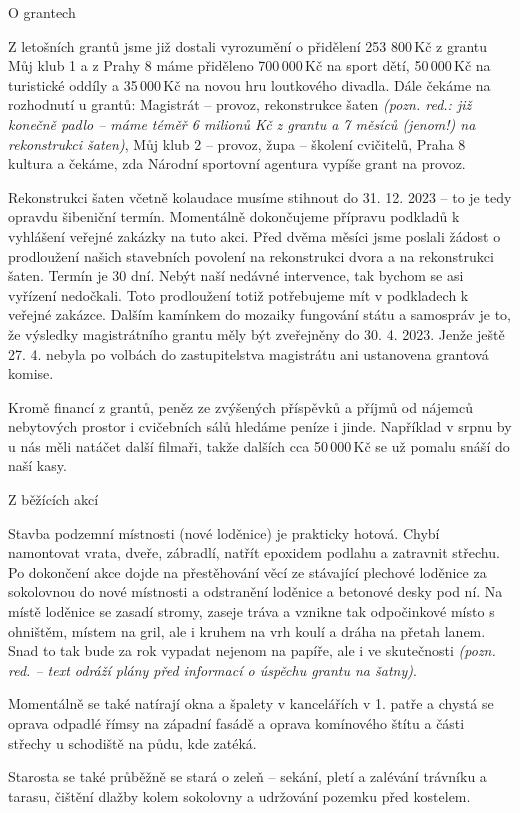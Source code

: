 \documentclass[11pt]{article}
\newcommand{\subpost}[1]{%
\vspace*{12pt}
\begin{center}
{\Large \tyrs #1}
\end{center}}
\begin{document}
\subpost{O grantech}
Z letošních grantů jsme již dostali vyrozumění o přidělení 253 800\,Kč z grantu Můj klub 1 a z Prahy 8 máme přiděleno 700\,000\,Kč na sport dětí, 50\,000\,Kč na turistické oddíly a 35\,000\,Kč na novou hru loutkového divadla. Dále čekáme na rozhodnutí u grantů: Magistrát – provoz, rekonstrukce šaten \textit{(pozn. red.: již konečně padlo – máme téměř 6 milionů Kč z grantu a 7 měsíců (jenom!) na rekonstrukci šaten)}, Můj klub 2 – provoz, župa – školení cvičitelů, Praha 8 kultura a čekáme, zda Národní sportovní agentura vypíše grant na provoz.

Rekonstrukci šaten včetně kolaudace musíme stihnout do 31. 12. 2023 – to je tedy opravdu šibeniční termín. Momentálně dokončujeme přípravu podkladů k vyhlášení veřejné zakázky na tuto akci. Před dvěma měsíci jsme poslali žádost o prodloužení našich stavebních povolení na rekonstrukci dvora a na rekonstrukci šaten. Termín je 30 dní. Nebýt naší nedávné intervence, tak bychom se asi vyřízení nedočkali. Toto prodloužení totiž potřebujeme mít v podkladech k veřejné zakázce. Dalším kamínkem do mozaiky fungování státu a samospráv je to, že výsledky magistrátního grantu měly být zveřejněny do 30. 4. 2023. Jenže ještě 27. 4. nebyla po volbách do zastupitelstva magistrátu ani ustanovena grantová komise. 

Kromě financí z grantů, peněz ze zvýšených příspěvků a příjmů od nájemců nebytových prostor i cvičebních sálů hledáme peníze i jinde. Například v srpnu by u nás měli natáčet další filmaři, takže dalších cca 50\,000\,Kč se už pomalu snáší do naší kasy.

\subpost{Z běžících akcí}
Stavba podzemní místnosti (nové loděnice) je prakticky hotová. Chybí namontovat vrata, dveře, zábradlí, natřít epoxidem podlahu a zatravnit střechu. Po dokončení akce dojde na přestěhování věcí ze stávající plechové loděnice za sokolovnou do nové místnosti a odstranění loděnice a betonové desky pod ní. Na místě loděnice se zasadí stromy, zaseje tráva a vznikne tak odpočinkové místo s ohništěm, místem na gril, ale i kruhem na vrh koulí a dráha na přetah lanem. Snad to tak bude za rok vypadat nejenom na papíře, ale i ve skutečnosti \textit{(pozn. red. – text odráží plány před informací o úspěchu grantu na šatny)}.

Momentálně se také natírají okna a špalety v kancelářích v 1. patře a chystá se oprava odpadlé římsy na západní fasádě a oprava komínového štítu a části střechy u schodiště na půdu, kde zatéká.

Starosta se také průběžně se stará o zeleň – sekání, pletí a zalévání trávníku a tarasu, čištění dlažby kolem sokolovny a udržování pozemku před kostelem.
\end{document}
